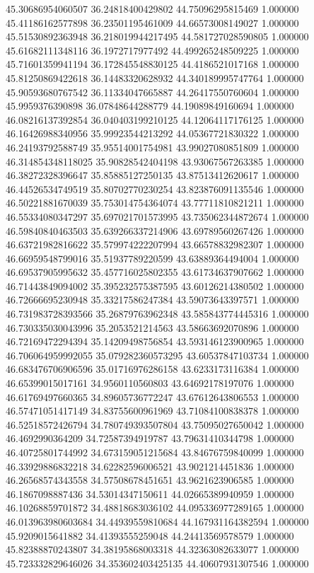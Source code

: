 45.30686954060507	36.24818400429802	44.75096295815469	1.000000
45.41186162577898	36.23501195461009	44.66573008149027	1.000000
45.51530892363948	36.218019944217495	44.581727028590805	1.000000
45.61682111348116	36.1972717977492	44.499265248509225	1.000000
45.71601359941194	36.172845548830125	44.4186521017168	1.000000
45.81250869422618	36.14483320628932	44.340189995747764	1.000000
45.90593680767542	36.11334047665887	44.26417550760604	1.000000
45.9959376390898	36.07848644288779	44.19089849160694	1.000000
46.08216137392854	36.040403199210125	44.12064117176125	1.000000
46.16426988340956	35.99923544213292	44.05367721830322	1.000000
46.24193792588749	35.95514001754981	43.99027080851809	1.000000
46.314854348118025	35.90828542404198	43.93067567263385	1.000000
46.38272328396647	35.85885127250135	43.87513412620617	1.000000
46.44526534749519	35.80702770230254	43.823876091135546	1.000000
46.50221881670039	35.753014754364074	43.77711810821211	1.000000
46.55334080347297	35.697021701573995	43.735062344872674	1.000000
46.59840840463503	35.639266337214906	43.69789560267426	1.000000
46.63721982816622	35.579974222207994	43.66578832982307	1.000000
46.66959548799016	35.51937789220599	43.63889364494004	1.000000
46.69537905995632	35.457716025802355	43.61734637907662	1.000000
46.71443849094002	35.395232575387595	43.60126214380502	1.000000
46.72666695230948	35.33217586247384	43.59073643397571	1.000000
46.731983728393566	35.26879763962348	43.585843774445316	1.000000
46.730335030043996	35.2053521214563	43.58663692070896	1.000000
46.72169472294394	35.14209498756854	43.593146123900965	1.000000
46.706064959992055	35.079282360573295	43.60537847103734	1.000000
46.683476706906596	35.01716976286158	43.6233173116384	1.000000
46.65399015017161	34.9560110560803	43.64692178197076	1.000000
46.61769497660365	34.89605736772247	43.67612643806553	1.000000
46.57471051417149	34.83755600961969	43.71084100838378	1.000000
46.52518572426794	34.780749393507804	43.75095027650042	1.000000
46.4692990364209	34.72587394919787	43.79631410344798	1.000000
46.40725801744992	34.673159051215684	43.84676759840099	1.000000
46.33929886832218	34.62282596006521	43.9021214451836	1.000000
46.26568574343558	34.57508678451651	43.9621623906585	1.000000
46.1867098887436	34.53014347150611	44.02665389940959	1.000000
46.10268859701872	34.48818683036102	44.095336977289165	1.000000
46.013963980603684	34.44939559810684	44.167931164382594	1.000000
45.9209015641882	34.41393555259048	44.24413569578579	1.000000
45.82388870243807	34.38195868003318	44.32363082633077	1.000000
45.723332829646026	34.353602403425135	44.40607931307546	1.000000
